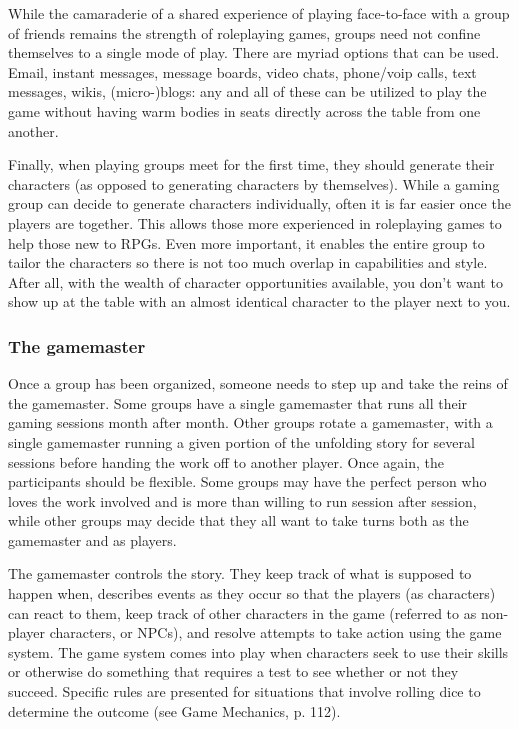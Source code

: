 While the camaraderie of a shared experience of playing face-to-face with a group of friends remains the strength of roleplaying games, groups need not confine themselves to a single mode of play. There are myriad options that can be used. Email, instant messages, message boards, video chats, phone/voip calls, text messages, wikis, (micro-)blogs: any and all of these can be utilized to play the game without having warm bodies in seats directly across the table from one another. 

Finally, when playing groups meet for the first time, they should generate their characters (as opposed to generating characters by themselves). While a gaming group can decide to generate characters individually, often it is far easier once the players are together. This allows those more experienced in roleplaying games to help those new to RPGs. Even more important, it enables the entire group to tailor the characters so there is not too much overlap in capabilities and style. After all, with the wealth of character opportunities available, you don't want to show up at the table with an almost identical character to the player next to you. 

\subsubsection{The gamemaster} \label{sec:gamemaster} 

Once a group has been organized, someone needs to step up and take the reins of the gamemaster. Some groups have a single gamemaster that runs all their gaming sessions month after month. Other groups rotate a gamemaster, with a single gamemaster running a given portion of the unfolding story for several sessions before handing the work off to another player. Once again, the participants should be flexible. Some groups may have the perfect person who loves the work involved and is more than willing to run session after session, while other groups may decide that they all want to take turns both as the gamemaster and as players. 

The gamemaster controls the story. They keep track of what is supposed to happen when, describes events as they occur so that the players (as characters) can react to them, keep track of other characters in the game (referred to as non-player characters, or NPCs), and resolve attempts to take action using the game system. The game system comes into play when characters seek to use their skills or otherwise do something that requires a test to see whether or not they succeed. Specific rules are presented for situations that involve rolling dice to determine the outcome (see Game Mechanics, p. 112). 

